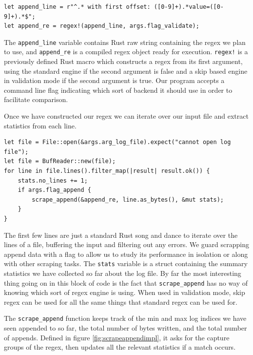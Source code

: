 \begin{verbatim}
let append_line = r"^.* with first offset: ([0-9]+).*value=([0-9]+).*$";
let append_re = regex!(append_line, args.flag_validate);
\end{verbatim}

\noindent
The \verb'append_line' variable contains Rust raw string containing the regex we
plan to use, and \verb'append_re' is a compiled regex object ready for
execution. \verb'regex!' is a previously defined Rust macro which
constructs a regex from its first argument, using the standard engine
if the second argument is false and a skip based engine in validation
mode if the second argument is true. Our program accepts a command
line flag indicating which sort of backend it should use in order
to facilitate comparison.

Once we have constructed our regex we can iterate over our input
file and extract statistics from each line.

\begin{verbatim}
let file = File::open(&args.arg_log_file).expect("cannot open log file");
let file = BufReader::new(file);
for line in file.lines().filter_map(|result| result.ok()) {
    stats.no_lines += 1;
    if args.flag_append {
        scrape_append(&append_re, line.as_bytes(), &mut stats);
    }
} 
\end{verbatim}

The first few lines are just a standard Rust song and dance to
iterate over the lines of a file, buffering the input and filtering
out any errors. We guard scrapping append data with a flag to allow
us to study its performance in isolation or along with other
scraping tasks. The \verb'stats' variable is a struct containing the summary
statistics we have collected so far about the log file. By far
the most interesting thing going on in this block of code is
the fact that \verb'scrape_append' has no way of knowing which
sort of regex engine is using. When used in validation mode,
skip regex can be used for all the same things that standard
regex can be used for.

The \verb'scrape_append' function keeps track of the min and max log
indices we have seen appended to so far, the total
number of bytes written, and the total number of appends.
Defined in figure \ref{fig:scrapeappendimpl},
it asks for the capture groups of the regex,
then updates all the relevant statistics if a match occurs.

